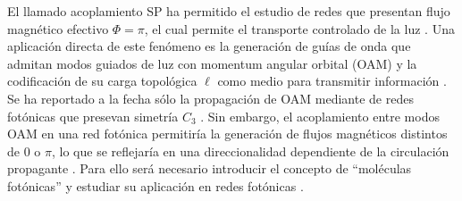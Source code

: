 	El llamado acoplamiento SP ha permitido el estudio de redes que presentan flujo magnético efectivo $\Phi = \pi$, el cual permite el transporte controlado de la luz \cite{OAMCaging, ABCaging}. Una aplicación directa de este fenómeno es la generación de guías de onda que admitan modos guiados de luz con momentum angular orbital (OAM) y la codificación de su carga topológica $\ell$ como medio para transmitir información \cite{oamapp, oamfree}. Se ha reportado a la fecha sólo la propagación de OAM mediante de redes fotónicas que presevan simetría $C_3$ \cite{OAMWG, vortex}. Sin embargo, el acoplamiento entre modos OAM en una red fotónica permitiría la generación de flujos magnéticos distintos de $0$ o $\pi$, lo que se reflejaría en una direccionalidad dependiente de la circulación propagante \cite{vortextrim, topoOAM}. Para ello será necesario introducir el concepto de ``moléculas fotónicas'' \cite{molecules} y estudiar su aplicación en redes fotónicas \cite{SPSSH}.